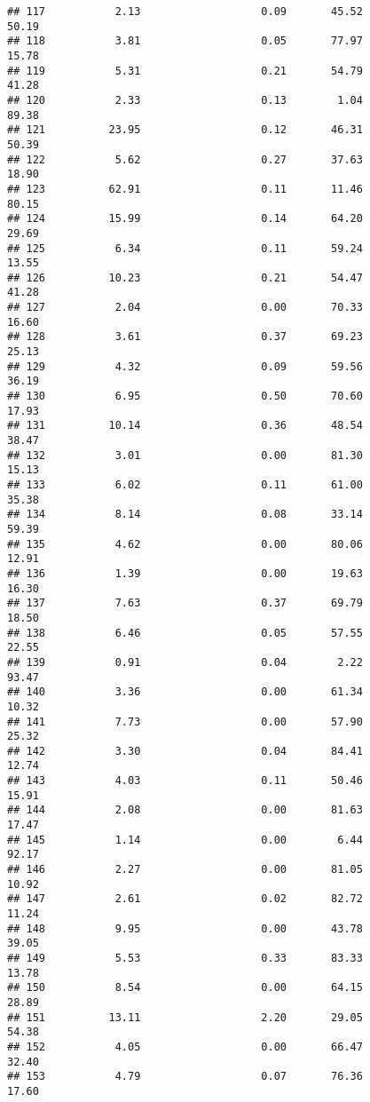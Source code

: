 \documentclass[
]{article}
\begin{document}
\begin{verbatim}
## 117           2.13                   0.09       45.52          50.19
## 118           3.81                   0.05       77.97          15.78
## 119           5.31                   0.21       54.79          41.28
## 120           2.33                   0.13        1.04          89.38
## 121          23.95                   0.12       46.31          50.39
## 122           5.62                   0.27       37.63          18.90
## 123          62.91                   0.11       11.46          80.15
## 124          15.99                   0.14       64.20          29.69
## 125           6.34                   0.11       59.24          13.55
## 126          10.23                   0.21       54.47          41.28
## 127           2.04                   0.00       70.33          16.60
## 128           3.61                   0.37       69.23          25.13
## 129           4.32                   0.09       59.56          36.19
## 130           6.95                   0.50       70.60          17.93
## 131          10.14                   0.36       48.54          38.47
## 132           3.01                   0.00       81.30          15.13
## 133           6.02                   0.11       61.00          35.38
## 134           8.14                   0.08       33.14          59.39
## 135           4.62                   0.00       80.06          12.91
## 136           1.39                   0.00       19.63          16.30
## 137           7.63                   0.37       69.79          18.50
## 138           6.46                   0.05       57.55          22.55
## 139           0.91                   0.04        2.22          93.47
## 140           3.36                   0.00       61.34          10.32
## 141           7.73                   0.00       57.90          25.32
## 142           3.30                   0.04       84.41          12.74
## 143           4.03                   0.11       50.46          15.91
## 144           2.08                   0.00       81.63          17.47
## 145           1.14                   0.00        6.44          92.17
## 146           2.27                   0.00       81.05          10.92
## 147           2.61                   0.02       82.72          11.24
## 148           9.95                   0.00       43.78          39.05
## 149           5.53                   0.33       83.33          13.78
## 150           8.54                   0.00       64.15          28.89
## 151          13.11                   2.20       29.05          54.38
## 152           4.05                   0.00       66.47          32.40
## 153           4.79                   0.07       76.36          17.60

\end{verbatim}
\end{document}
